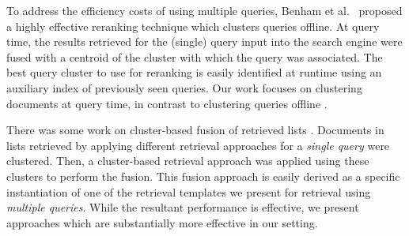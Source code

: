 To address the efficiency costs of using multiple queries, Benham et
al.~\cite{Benham+al:19a} proposed a highly effective reranking
technique which clusters queries offline.
At query time, the results retrieved for the (single) query input
into the search engine were fused with a centroid of the cluster with
which the query was associated.
The best query cluster to use for reranking is easily identified at
runtime using an auxiliary index of previously seen queries.
Our work focuses on clustering documents at query time, in contrast
to clustering queries offline \cite{Benham+al:19a}.


There was some work on cluster-based fusion of retrieved lists
\cite{Kozorovitzky+Kurland:11b}. Documents in lists retrieved by applying different
retrieval approaches for a {\em single query} were
clustered. Then, a cluster-based retrieval approach was applied using
these clusters to perform the fusion. This fusion approach is easily derived as a specific instantiation of one of the retrieval templates we present for retrieval using {\em multiple queries}. While the resultant performance is effective, we present approaches which are substantially more effective in our setting.



\endinput

Previous work on cluster-based fusion of lists retrieved by different
search systems for a single query used the documents in retrieved
lists for clustering

along with multiple ranking models for a
{\em single query} to induce cluster~\cite{Kozorovitzky+Kurland:11b}.
\shane{Did I get this right?
Sorry the initial text was a little unclear.}
Then, a cluster-based retrieval approach was applied using these
clusters to perform the fusion.
This fusion approach can be derived as a specific instantiation of
one of the retrieval templates we present for retrieval using {\em
multiple queries}.
While the performance of this adaptation is in fact highly effective,
we show that the performance can be further improved in this work.

